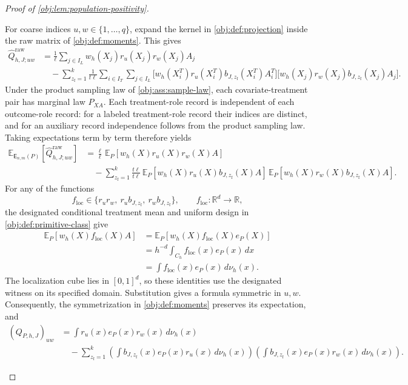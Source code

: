 \begin{proof}[Proof of \cref{obj:lem:population-positivity}]
\begin{enumerate}
For coarse indices \(u,w\in\{1,\ldots,q\}\), expand the kernel in
\cref{obj:def:projection} inside the raw matrix of
\cref{obj:def:moments}. This gives
\[
\begin{aligned}
\widehat Q^{\mathrm{raw}}_{h,J;uw}
&=\frac1\ell\sum_{j\in I_L}
 w_h(X_j)r_u(X_j)r_w(X_j)A_j\\
&\quad-\sum_{z_{\mathrm f}=1}^{k}\frac1{t\ell}
 \sum_{i\in I_T}\sum_{j\in I_L}
 \bigl[w_h(X_i^T)r_u(X_i^T)b_{J,z_{\mathrm f}}(X_i^T)A_i^T\bigr]
 \bigl[w_h(X_j)r_w(X_j)b_{J,z_{\mathrm f}}(X_j)A_j\bigr].
\end{aligned}
\]
Under the product sampling law of \cref{obj:ass:sample-law}, each covariate-treatment pair has marginal law \(P_{XA}\). Each treatment-role record is independent of each outcome-role record: for a labeled treatment-role record their indices are distinct, and for an auxiliary record independence follows from the product sampling law. Taking expectations term by term therefore yields
\[
\begin{aligned}
\mathbb E_{\mathsf E_{n,m}(P)}
 [\widehat Q^{\mathrm{raw}}_{h,J;uw}]
&=\frac{\ell}{\ell}\,
 \mathbb E_P[w_h(X)r_u(X)r_w(X)A]\\
&\quad-\sum_{z_{\mathrm f}=1}^{k}\frac{t\ell}{t\ell}\,
 \mathbb E_P[w_h(X)r_u(X)b_{J,z_{\mathrm f}}(X)A]\,
 \mathbb E_P[w_h(X)r_w(X)b_{J,z_{\mathrm f}}(X)A].
\end{aligned}
\]
For any of the functions
\[
f_{\mathrm{loc}}\in
\{r_ur_w,\ r_ub_{J,z_{\mathrm f}},\ r_wb_{J,z_{\mathrm f}}\},
\qquad
f_{\mathrm{loc}}:\mathbb R^d\longrightarrow\mathbb R,
\]
the designated conditional treatment mean and uniform design in
\cref{obj:def:primitive-class} give
\[
\begin{aligned}
\mathbb E_P[w_h(X)f_{\mathrm{loc}}(X)A]
&=\mathbb E_P[w_h(X)f_{\mathrm{loc}}(X)e_P(X)]\\
&=h^{-d}\int_{C_h}f_{\mathrm{loc}}(x)e_P(x)\,dx\\
&=\int f_{\mathrm{loc}}(x)e_P(x)\,d\nu_h(x).
\end{aligned}
\]
The localization cube lies in \([0,1]^d\), so these identities use the designated witness on its specified domain. Substitution gives a formula symmetric in \(u,w\). Consequently, the symmetrization in \cref{obj:def:moments} preserves its expectation, and
\[
\begin{aligned}
(Q_{P,h,J})_{uw}
&=\int r_u(x)e_P(x)r_w(x)\,d\nu_h(x)\\
&\quad-\sum_{z_{\mathrm f}=1}^{k}
 \left(\int b_{J,z_{\mathrm f}}(x)e_P(x)r_u(x)\,d\nu_h(x)\right)
 \left(\int b_{J,z_{\mathrm f}}(x)e_P(x)r_w(x)\,d\nu_h(x)\right).
\end{aligned}
\]


\end{enumerate}
\end{proof}
